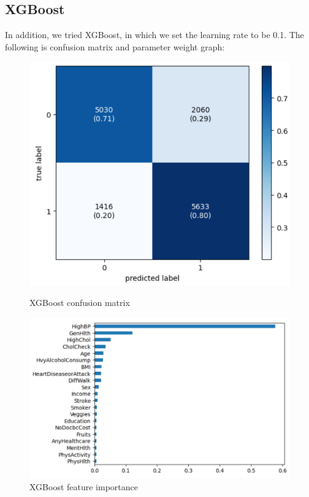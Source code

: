\documentclass[12pt]{article}
\begin{document}
\subsection{XGBoost}
In addition, we tried XGBoost, in which we set the learning rate to be 0.1. The following is confusion matrix and parameter weight graph:
\begin{figure}[H]
  \centering
  \begin{minipage}[b]{0.45\textwidth}
    \centering
    \includegraphics[width=0.7\linewidth]{xgboost_cm.png}
    \caption{XGBoost confusion matrix}
  \end{minipage}\hfill
  \begin{minipage}[b]{0.45\textwidth}
    \centering
    \includegraphics[width=0.7\linewidth]{xgboost_w.png}
    \caption{XGBoost feature importance}
  \end{minipage}
\end{figure}
\end{document}
